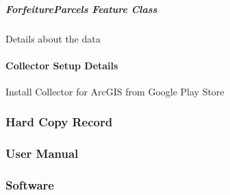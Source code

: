 \documentclass[class=article , crop=false, titlepage, twoside, multi={itemize, figure, verbatim}, float=false]{standalone}
\begin{document}
\subparagraph{ForfeitureParcels Feature Class\\}
Details about the data
\clearpage
\paragraph{Collector Setup Details\\}
Install Collector for ArcGIS from Google Play Store

\clearpage
\subsubsection{Hard Copy Record}
\clearpage
\subsubsection{User Manual}
\clearpage
\subsubsection{Software}
\clearpage
\end{document}
